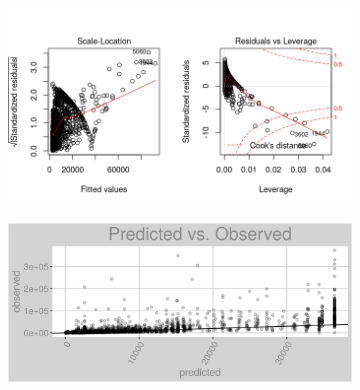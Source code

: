 \begin{figure}[h]
\centering
\begin{subfigure}{1\textwidth}
\centering
\includegraphics[width=.99\textwidth, height=0.475\textheight]{Images/electricity_rfe_res_2.png}
\end{subfigure}
\begin{subfigure}{1\textwidth}
\centering
\includegraphics[width=.99\textwidth, height=0.3\textheight]{Images/electricity_rfe_pvo.png}
\end{subfigure}
\end{figure}
\newpage
